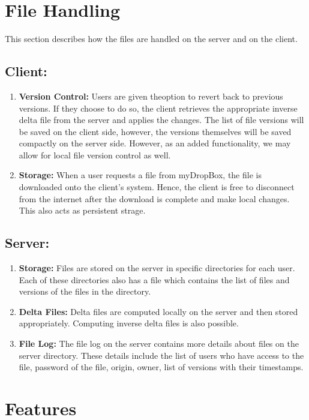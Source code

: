 \documentclass[]{article}
\begin{document}
\section{\Large File Handling}
This section describes how the files are handled on the server and on the client.
\subsection{\textbf{Client:}}
	\begin{enumerate}
	\item \textbf{Version Control:} 
	Users are given theoption to revert back to previous versions. If they choose to do so, the client retrieves the appropriate inverse delta file from the server and applies the changes. The list of file versions will be saved on the client side, however, the versions themselves will be saved compactly on the server side. However, as an added functionality, we may allow for local file version control as well. 
	\item \textbf{Storage:}
	When a user requests a file from myDropBox, the file is downloaded onto the client's system. Hence, the client is free to disconnect from the internet after the download is complete and make local changes. This also acts as persistent strage.
	\end{enumerate}
\subsection{\textbf{Server:}} 
\begin{enumerate}
\item \textbf{Storage:}
Files are stored on the server in specific directories for each user. Each of these directories also has a file which contains the list of files and versions of the files in the directory. 
\item \textbf{Delta Files:}
Delta files are computed locally on the server and then stored appropriately. Computing inverse delta files is also possible.
\item \textbf{File Log:}
The file log on the server contains more details about files on the server directory. These details include the list of users who have access to the file, password of the file, origin, owner, list of versions with their timestamps.
\end{enumerate}


\section{\LARGE Features}
\end{document}
